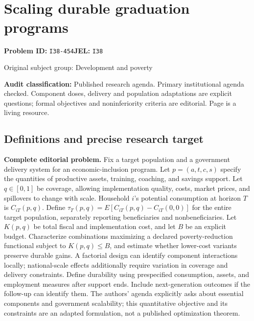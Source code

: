 \documentclass[11pt,a4paper]{article}
\begin{document}
\section*{Scaling durable graduation programs}
\textbf{Problem ID:} \texttt{I38-454}\quad \textbf{JEL:} \texttt{I38}\par
\label{problem:OP-0371}
{\sffamily\small\color{muted}Original subject group: Development and poverty\par}
\label{definitions:problem:30007653}
\textbf{Audit classification:} Published research agenda. Primary institutional agenda checked. Component doses, delivery and population adaptations are explicit questions; formal objectives and noninferiority criteria are editorial. Page is a living resource.
\subsection*{Definitions and precise research target}
\textbf{Complete editorial problem.} Fix a target population and a government delivery system for an economic-inclusion program. Let \(p=(a,t,c,s)\) specify the quantities of productive assets, training, coaching, and savings support. Let \(q\in[0,1]\) be coverage, allowing implementation quality, costs, market prices, and spillovers to change with scale. Household \(i\)'s potential consumption at horizon \(T\) is \(C_{iT}(p,q)\). Define \(\tau_T(p,q)=E[C_{iT}(p,q)-C_{iT}(0,0)]\) for the entire target population, separately reporting beneficiaries and nonbeneficiaries. Let \(K(p,q)\) be total fiscal and implementation cost, and let \(B\) be an explicit budget. Characterize combinations maximizing a declared poverty-reduction functional subject to \(K(p,q)\le B\), and estimate whether lower-cost variants preserve durable gains. A factorial design can identify component interactions locally; national-scale effects additionally require variation in coverage and delivery constraints. Define durability using prespecified consumption, assets, and employment measures after support ends. Include next-generation outcomes if the follow-up can identify them. The authors' agenda explicitly asks about essential components and government scalability; this quantitative objective and its constraints are an adapted formulation, not a published optimization theorem.
\end{document}
